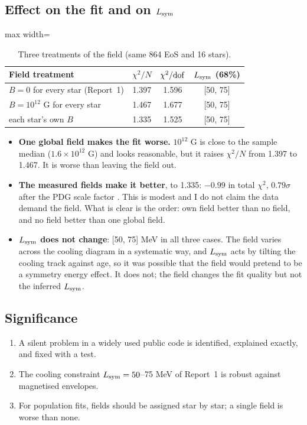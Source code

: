 \documentclass[11pt,a4paper]{article}
\newcommand{\Lsym}{L_{\rm sym}}
\begin{document}
\subsection{Effect on the fit and on $\Lsym$}
\begin{table}[h]
\centering
\caption{Three treatments of the field (same 864 EoS and 16 stars).}\label{tab:fits}
\begin{adjustbox}{max width=\linewidth}
\begin{tabular}{lccc}
\toprule
Field treatment & $\chi^2/N$ & $\chi^2/{\rm dof}$ & $\Lsym$ (68\%)\\
\midrule
$B=0$ for every star (Report~1) & 1.397 & 1.596 & [50, 75]\\
$B=10^{12}$ G for every star & 1.467 & 1.677 & [50, 75]\\
each star's own $B$ & 1.335 & 1.525 & [50, 75]\\
\bottomrule
\end{tabular}
\end{adjustbox}
\end{table}
\begin{itemize}
\item \textbf{One global field makes the fit worse.} $10^{12}$ G is close to the sample median ($1.6\times10^{12}$ G) and looks reasonable, but it raises $\chi^2/N$ from 1.397 to 1.467. It is worse than leaving the field out.
\item \textbf{The measured fields make it better}, to 1.335: $-0.99$ in total $\chi^2$, $0.79\sigma$ after the PDG scale factor \cite{PDG2024}. This is modest and I do not claim the data demand the field. What is clear is the order: own field better than no field, and no field better than one global field.
\item \textbf{$\Lsym$ does not change}: [50, 75] MeV in all three cases. The field varies across the cooling diagram in a systematic way, and $\Lsym$ acts by tilting the cooling track against age, so it was possible that the field would pretend to be a symmetry energy effect. It does not; the field changes the fit quality but not the inferred $\Lsym$.
\end{itemize}

\subsection{Significance}
\begin{enumerate}
\item A silent problem in a widely used public code is identified, explained exactly, and fixed with a test.
\item The cooling constraint $\Lsym=50$--75 MeV of Report~1 is robust against magnetised envelopes.
\item For population fits, fields should be assigned star by star; a single field is worse than none.
\end{enumerate}
\end{document}
